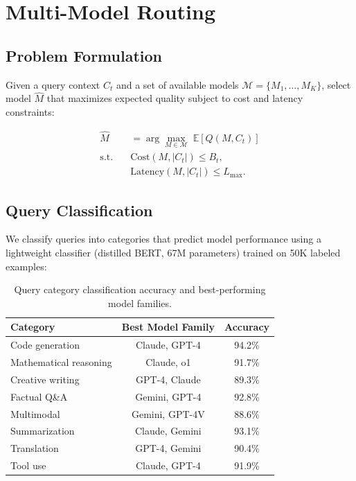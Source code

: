\section{Multi-Model Routing}

\label{sec:routing}

\subsection{Problem Formulation}

Given a query context $C_t$ and a set of available models $\mathcal{M} = \{M_1, \ldots, M_K\}$, select model $\hat{M}$ that maximizes expected quality subject to cost and latency constraints:

\begin{align}
\hat{M} &= \arg\max_{M \in \mathcal{M}} \; \mathbb{E}[Q(M, C_t)] \label{eq:routing} \\
\text{s.t.} \quad & \text{Cost}(M, |C_t|) \le B_t, \nonumber \\
& \text{Latency}(M, |C_t|) \le L_{\max}. \nonumber
\end{align}

\subsection{Query Classification}

We classify queries into categories that predict model performance using a lightweight classifier (distilled BERT, 67M parameters) trained on 50K labeled examples:

\begin{table}[H]
\centering
\small
\begin{tabular}{lcc}
\toprule
\textbf{Category} & \textbf{Best Model Family} & \textbf{Accuracy} \\
\midrule
Code generation & Claude, GPT-4 & 94.2\% \\
Mathematical reasoning & Claude, o1 & 91.7\% \\
Creative writing & GPT-4, Claude & 89.3\% \\
Factual Q\&A & Gemini, GPT-4 & 92.8\% \\
Multimodal & Gemini, GPT-4V & 88.6\% \\
Summarization & Claude, Gemini & 93.1\% \\
Translation & GPT-4, Gemini & 90.4\% \\
Tool use & Claude, GPT-4 & 91.9\% \\
\bottomrule
\end{tabular}
\caption{Query category classification accuracy and best-performing model families.}
\label{tab:categories}
\end{table}

